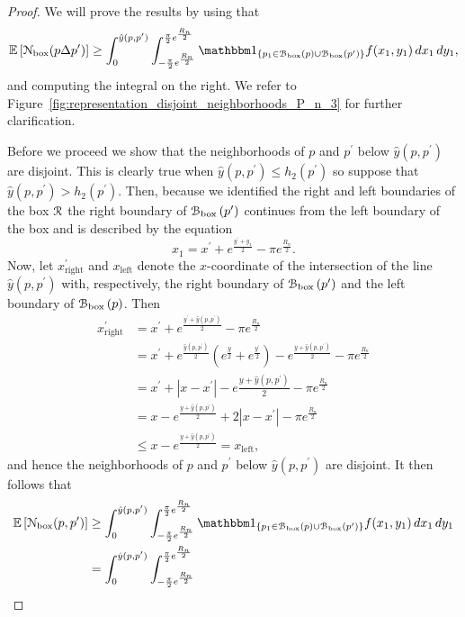 \begin{proof}
We will prove the results by using that
\[
	\Exp{\Ncal_{\text{box}}(p\Delta p^\prime)} 
	\ge \int_0^{\hat{y}(p,p^\prime)} \int_{-\frac{\pi}{2}e^{\frac{R_n}{2}}}^{\frac{\pi}{2}e^{\frac{R_n}{2}}} \ind{p_1 \in \BallPon{p} \cup \BallPon{p^\prime}} f(x_1,y_1) \, dx_1 \, dy_1,
\]
and computing the integral on the right. We refer to Figure~\ref{fig:representation_disjoint_neighborhoods_P_n_3} for further clarification. 

Before we proceed we show that the neighborhoods of $p$ and $p^\prime$ below $\hat{y}(p,p^\prime)$ are disjoint. This is clearly true when $\hat{y}(p,p^\prime) \le h_2(p^\prime)$ so suppose that $\hat{y}(p,p^\prime) > h_2(p^\prime)$. Then, because we identified the right and left boundaries of the box ${\mathcal R}$ the right boundary of ${\mathcal B}_{\text{box}}\left(p^\prime\right)$ continues from the left boundary of the box and is described by the equation
\[
	x_1 = x^\prime + e^{\frac{y^\prime + y_1}{2}} - \pi e^{\frac{R_n}{2}}.
\]
Now, let $x_{\mathrm{right}}^\prime$ and $x_{\mathrm{left}}$ denote the $x$-coordinate of the intersection of the line $\hat{y}(p,p^\prime)$ with, respectively, the right boundary of ${\mathcal B}_{\text{box}}\left(p^\prime\right)$ and the left boundary of ${\mathcal B}_{\text{box}}\left(p\right)$. Then
\begin{align*}
	x_{\mathrm{right}}^\prime &= x^\prime + e^{\frac{y^\prime + \hat{y}(p,p^\prime)}{2}} - \pi e^{\frac{R_n}{2}}\\
	&= x^\prime + e^{\frac{\hat{y}(p,p^\prime)}{2}}\left(e^{\frac{y}{2}} + e^{\frac{y^\prime}{2}}\right)
		- e^{\frac{y + \hat{y}(p,p^\prime)}{2}} - \pi e^{\frac{R_n}{2}}\\
	&= x^\prime + |x - x^\prime| - e{\frac{y + \hat{y}(p,p^\prime)}{2}} - \pi e^{\frac{R_n}{2}}\\
	&= x - e^{\frac{y + \hat{y}(p,p^\prime)}{2}} + 2|x - x^\prime| - \pi e^{\frac{R_n}{2}}\\
	&\le x - e^{\frac{y + \hat{y}(p,p^\prime)}{2}} = x_{\mathrm{left}},
\end{align*}
and hence the neighborhoods of $p$ and $p^\prime$ below $\hat{y}(p,p^\prime)$ are disjoint. It then follows that
\begin{align*}
	\Exp{\Ncal_{\text{box}}(p,p^\prime)} 
	&\ge \int_0^{\hat{y}(p,p^\prime)} \int_{-\frac{\pi}{2}e^{\frac{R_n}{2}}}^{\frac{\pi}{2}e^{\frac{R_n}{2}}} 
		\ind{p_1 \in \BallPon{p} \cup \BallPon{p^\prime}} f(x_1,y_1) \, dx_1 \, dy_1\\
	&= \int_0^{\hat{y}(p,p^\prime)} \int_{-\frac{\pi}{2}e^{\frac{R_n}{2}}}^{\frac{\pi}{2}e^{\frac{R_n}{2}}} 

\end{align*}
\end{proof}
